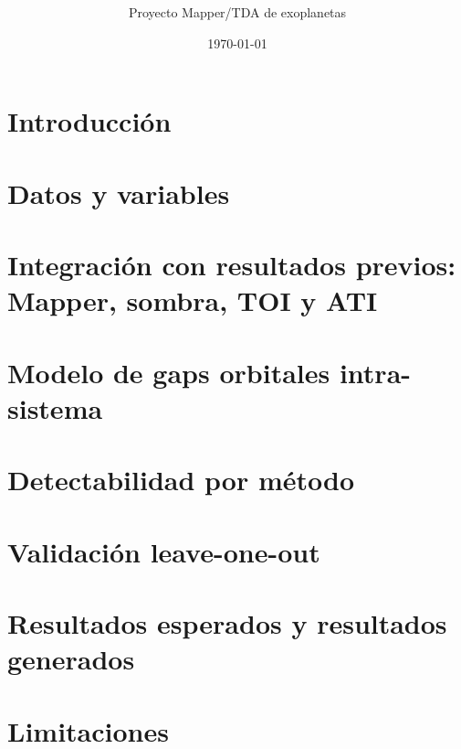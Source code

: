 \documentclass[11pt]{article}
\title{\reporttitle\\[0.4em]\large \reportsubtitle}
\author{Proyecto Mapper/TDA de exoplanetas}
\date{\today}
\begin{document}
\maketitle


\tableofcontents
\clearpage

\section{Introducci\'on}


\section{Datos y variables}


\section{Integraci\'on con resultados previos: Mapper, sombra, TOI y ATI}


\section{Modelo de gaps orbitales intra-sistema}


\section{Detectabilidad por m\'etodo}


\section{Validaci\'on leave-one-out}


\section{Resultados esperados y resultados generados}


\section{Limitaciones}

\end{document}
